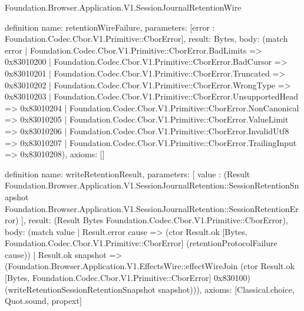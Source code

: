 \begin{lexlean}{Foundation.Browser.Application.V1.SessionJournalRetentionWire}
\begin{semanticmodule}
definition{
  name: retentionWireFailure,
  parameters: [error : Foundation.Codec.Cbor.V1.Primitive::CborError],
  result: Bytes,
  body: (match error
    | Foundation.Codec.Cbor.V1.Primitive::CborError.BadLimits => 0x83010200
    | Foundation.Codec.Cbor.V1.Primitive::CborError.BadCursor => 0x83010201
    | Foundation.Codec.Cbor.V1.Primitive::CborError.Truncated => 0x83010202
    | Foundation.Codec.Cbor.V1.Primitive::CborError.WrongType => 0x83010203
    | Foundation.Codec.Cbor.V1.Primitive::CborError.UnsupportedHead => 0x83010204
    | Foundation.Codec.Cbor.V1.Primitive::CborError.NonCanonical => 0x83010205
    | Foundation.Codec.Cbor.V1.Primitive::CborError.ValueLimit => 0x83010206
    | Foundation.Codec.Cbor.V1.Primitive::CborError.InvalidUtf8 => 0x83010207
    | Foundation.Codec.Cbor.V1.Primitive::CborError.TrailingInput => 0x83010208),
  axioms: []
}

definition{
  name: writeRetentionResult,
  parameters: [
    value : (Result Foundation.Browser.Application.V1.SessionJournalRetention::SessionRetentionSnapshot Foundation.Browser.Application.V1.SessionJournalRetention::SessionRetentionError)
  ],
  result: (Result Bytes Foundation.Codec.Cbor.V1.Primitive::CborError),
  body: (match value
    | Result.error cause => (ctor Result.ok [Bytes, Foundation.Codec.Cbor.V1.Primitive::CborError] (retentionProtocolFailure cause))
    | Result.ok snapshot => (Foundation.Browser.Application.V1.EffectsWire::effectWireJoin (ctor Result.ok [Bytes, Foundation.Codec.Cbor.V1.Primitive::CborError] 0x830100) (writeRetentionSessionRetentionSnapshot snapshot))),
  axioms: [Classical.choice, Quot.sound, propext]
}


\end{semanticmodule}
\end{lexlean}
